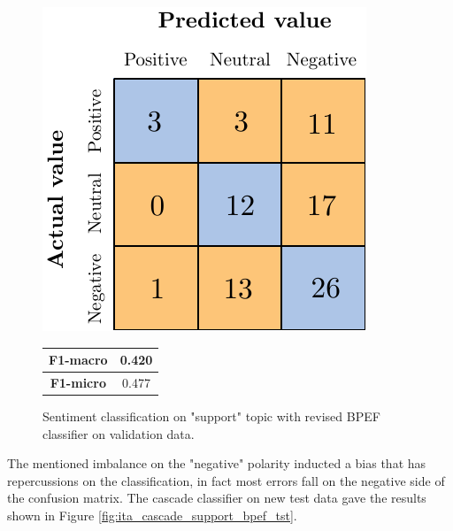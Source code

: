 \begin{figure}[H]
	\begin{minipage}[b]{0.6\linewidth}
		\centering
		\includegraphics[scale=1]{figures/conf_matrices/ita_support/ita_snt_support_bpef_afs.pdf}
	\end{minipage}
	\begin{minipage}[b]{0.3\linewidth}
		\begin{tabular}[b]{ | c | c | } 
			\hline
			\textbf{F1-macro} & 0.420 \\
			\hline
			\textbf{F1-micro} & 0.477 \\ 
			\hline
		\end{tabular}
	\end{minipage}
	\caption{Sentiment classification on "support" topic with revised BPEF classifier on validation data.}
	\label{fig:ita_snt_support_bpef_afs}
\end{figure}

The mentioned imbalance on the "negative" polarity inducted a bias that has repercussions on the classification, in fact most errors fall on the negative side of the confusion matrix. The cascade classifier on new test data gave the results shown in Figure \ref{fig:ita_cascade_support_bpef_tst}.


